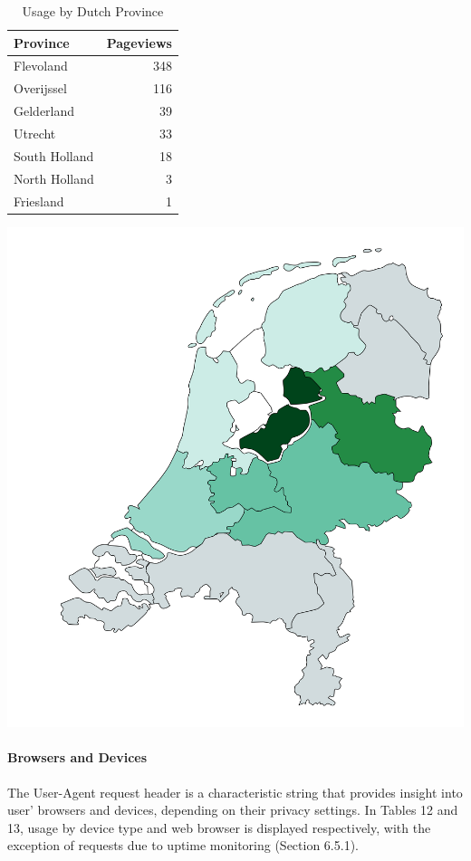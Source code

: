 \documentclass{article}
\begin{document}
\begin{table}[!htb]
	\begin{minipage}{.5\linewidth}
		\caption{Usage by Dutch Province}
		\centering
		\begin{tabular}{lr}
			\hline
			\textbf{Province} & \textbf{Pageviews} \\
			\hline
			Flevoland         & 348                \\
			Overijssel        & 116                \\
			Gelderland        & 39                 \\
			Utrecht           & 33                 \\
			South Holland     & 18                 \\
			North Holland     & 3                  \\
			Friesland         & 1                  \\
			\hline
		\end{tabular}
	\end{minipage}%
	\hspace{.1cm}
	\begin{minipage}{.5\linewidth}
		\centering
		\centering
		\includegraphics[width=0.66\linewidth]{location-netherlands.png}
		\label{fig:test2}
	\end{minipage} 
\end{table}

\paragraph{Browsers and Devices} The User-Agent request header is a characteristic string that provides insight into user' browsers and devices, depending on their privacy settings. In Tables 12 and 13, usage by device type and web browser is displayed respectively, with the exception of requests due to uptime monitoring (Section 6.5.1). 
\end{document}
